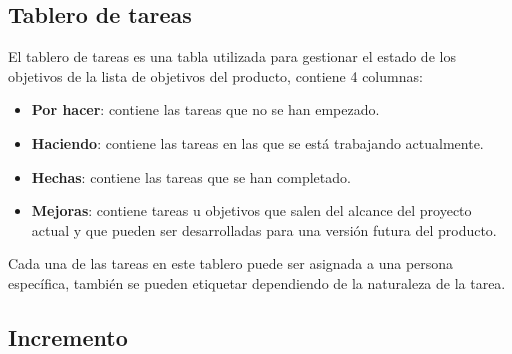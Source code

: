\subsection{Tablero de tareas}
El tablero de tareas es una tabla utilizada para gestionar el estado de los objetivos de la lista de objetivos del producto, contiene 4 columnas:

\begin{itemize}
    \item \textbf{Por hacer}: contiene las tareas que no se han empezado.
    \item \textbf{Haciendo}: contiene las tareas en las que se está trabajando actualmente.
    \item \textbf{Hechas}: contiene las tareas que se han completado.
    \item \textbf{Mejoras}: contiene tareas u objetivos que salen del alcance del proyecto actual y que pueden ser desarrolladas para una versión futura del producto.
\end{itemize}

Cada una de las tareas en este tablero puede ser asignada a una persona específica, también se pueden etiquetar dependiendo de la naturaleza de la tarea.

\subsection{Incremento} \label{increment}